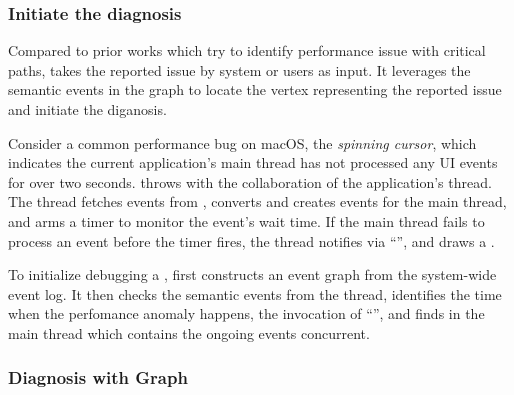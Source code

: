 \subsubsection{Initiate the diagnosis}

Compared to prior works which try to identify performance issue with critical
paths, \xxx takes the reported issue by system or users as input. It leverages
the semantic events in the graph to locate the vertex representing the reported
issue and initiate the diganosis.

Consider a common performance bug on macOS, the \emph{spinning cursor}, which
indicates the current application's main thread has not processed any UI
events for over two seconds.
 throws  with the collaboration of the
application's  thread.  The  thread fetches
 events from , converts and creates
 events for the main thread, and arms a timer to monitor the event's
wait time.  If the main thread fails to process an event before the timer
fires, the  thread notifies  via
``'', and  draws a .%

To initialize debugging a , \xxx first constructs an event
graph from the system-wide event log.  It then checks the semantic events from
the  thread, identifies the time when the perfomance anomaly
happens, the invocation of ``'', and finds
\spinningnode in the main thread which contains the ongoing events concurrent.

\subsubsection{Diagnosis with Graph}\label{subsec:debug}



